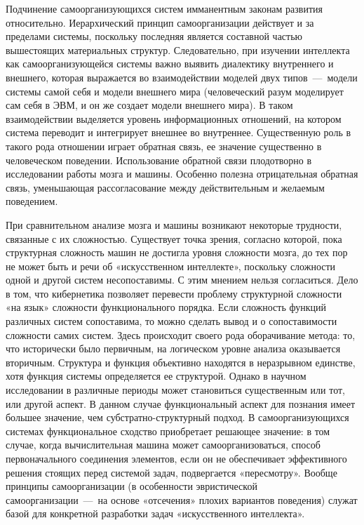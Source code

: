 \documentclass[14pt]{extarticle}
\begin{document}
Подчинение самоорганизующихся систем имманентным законам развития относительно. Иерархический принцип самоорганизации действует и за пределами системы, поскольку последняя является составной частью вышестоящих материальных структур. Следовательно, при изучении интеллекта как самоорганизующейся системы важно выявить диалектику внутреннего и внешнего, которая выражается во взаимодействии моделей двух типов~---~модели системы самой себя и модели внешнего мира (человеческий разум моделирует сам себя в ЭВМ, и он же создает модели внешнего мира). В таком взаимодействии выделяется уровень информационных отношений, на котором система переводит и интегрирует внешнее во внутреннее. Существенную роль в такого рода отношении играет обратная связь, ее значение существенно в человеческом поведении. Использование обратной связи плодотворно в исследовании работы мозга и машины. Особенно полезна отрицательная обратная связь, уменьшающая рассогласование между действительным и желаемым поведением.

При сравнительном анализе мозга и машины возникают некоторые трудности, связанные с их сложностью. Существует точка зрения, согласно которой, пока структурная сложность машин не достигла уровня сложности мозга, до тех пор не может быть и речи об «искусственном интеллекте», поскольку сложности одной и другой систем несопоставимы. С этим мнением нельзя согласиться. Дело в том, что кибернетика позволяет перевести проблему структурной сложности «на язык» сложности функционального порядка. Если сложность функций различных систем сопоставима, то можно сделать вывод и о сопоставимости сложности самих систем. Здесь происходит своего рода оборачивание метода: то, что исторически было первичным, на логическом уровне анализа оказывается вторичным. Структура и функция объективно находятся в неразрывном единстве, хотя функция системы определяется ее структурой. Однако в научном исследовании в различные периоды может становиться существенным или тот, или другой аспект. В данном случае функциональный аспект для познания имеет большее значение, чем субстратно-структурный подход. В самоорганизующихся системах функциональное сходство приобретает решающее значение: в том случае, когда вычислительная машина может самоорганизоваться, способ первоначального соединения элементов, если он не обеспечивает эффективного решения стоящих перед системой задач, подвергается «пересмотру». Вообще принципы самоорганизации (в особенности эвристической самоорганизации~---~на основе «отсечения» плохих вариантов поведения) служат базой для конкретной разработки задач «искусственного интеллекта».
\end{document}
